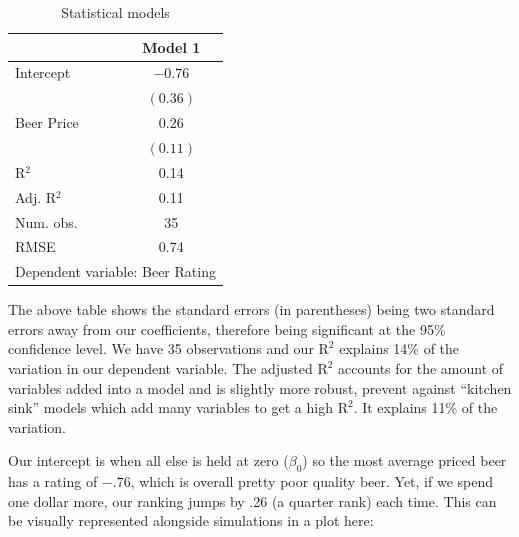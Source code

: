 \documentclass[12pt]{article}\usepackage[]{graphicx}\usepackage[]{color}
\begin{document}
\begin{flushleft}
\begin{table}[h!]
\caption{Statistical models}
\begin{center}
\begin{tabular}{l c }
\hline
 & Model 1 \\
\hline
Intercept  & $-0.76$  \\
           & $(0.36)$ \\
Beer Price & $0.26$   \\
           & $(0.11)$ \\
\hline
R$^2$      & 0.14     \\
Adj. R$^2$ & 0.11     \\
Num. obs.  & 35       \\
RMSE       & 0.74     \\
\hline
\multicolumn{2}{l}{\scriptsize{Dependent variable: Beer Rating}}
\end{tabular}
\end{center}
\end{table}



The above table shows the standard errors (in parentheses) being two standard errors away from our coefficients, therefore being significant at the 95\% confidence level. We have 35 observations and our $\text{R}^2$ explains 14\% of the variation in our dependent variable. The adjusted $\text{R}^2$ accounts for the amount of variables added into a model and is slightly more robust, prevent against ``kitchen sink'' models which add many variables to get a high  $\text{R}^2$. It explains 11\% of the variation.

Our intercept is when all else is held at zero ($\beta_0$) so the most average priced beer has a rating of $-.76$, which is overall pretty poor quality beer. Yet, if we spend one dollar more, our ranking jumps by .26 (a quarter rank) each time. This can be visually represented alongside simulations in a plot here: \\


\end{flushleft}
\end{document}
